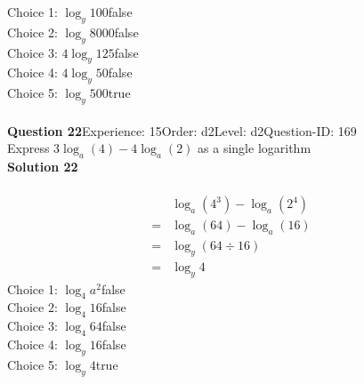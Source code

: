 \documentclass{article}
\begin{document}
Choice 1: \hspace{20pt}$\log_{y}100$\hspace{20pt}false\\
Choice 2: \hspace{20pt}$\log_{y}8000$\hspace{20pt}false\\
Choice 3: \hspace{20pt}$4\log_{y}125$\hspace{20pt}false\\
Choice 4: \hspace{20pt}$4\log_{y}50$\hspace{20pt}false\\
Choice 5: \hspace{20pt}$\log_{y}500$\hspace{20pt}true\\
\\[4pt]
\noindent\textbf{Question 22}\hspace{20pt}Experience: 15\hspace{20pt}Order: d2\hspace{20pt}Level: d2\hspace{20pt}Question-ID: 169\\[2pt]
Express $3\log_{a}(4)-4\log_{a}(2)$ as a single logarithm\\[4pt]
\noindent\textbf{Solution 22}\\[2pt]
\\[-35pt]\begin{align*}
&\log_{a}(4^3)-\log_{a}(2^4)\\[2pt]
=&\log_{a}(64)-\log_{a}(16)\\[2pt]
=&\log_{y}(64 \div 16)\\[2pt]
=&\log_{y}4
\end{align*}
Choice 1: \hspace{20pt}$\log_{4}a^2$\hspace{20pt}false\\
Choice 2: \hspace{20pt}$\log_{4}16$\hspace{20pt}false\\
Choice 3: \hspace{20pt}$\log_{4}64$\hspace{20pt}false\\
Choice 4: \hspace{20pt}$\log_{y}16$\hspace{20pt}false\\
Choice 5: \hspace{20pt}$\log_{y}4$\hspace{20pt}true\\
\end{document}
